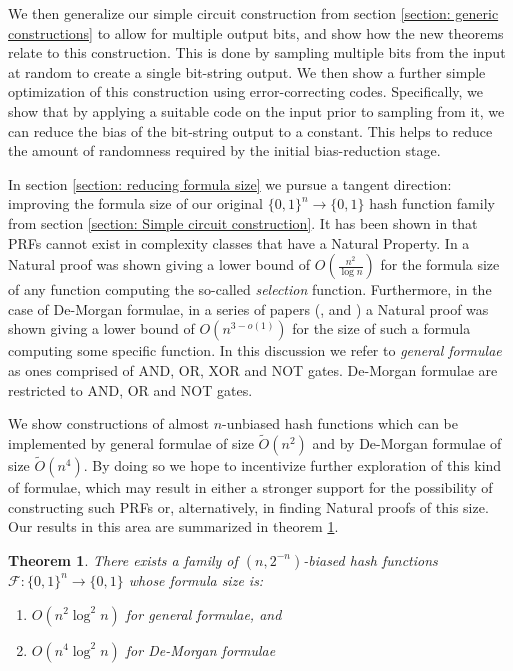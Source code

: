 \documentclass[12pt]{article}
\newtheorem{theorem}{Theorem}[section]
\newcommand{\zo}[1]{\{0,1\}^{#1}}
\begin{document}
	We then generalize our simple circuit construction from section \ref{section: generic constructions} to allow for multiple output bits, and show how the new theorems relate to this construction.
	This is done by sampling multiple bits from the input at random to create a single bit-string output.
	We then show a further simple optimization of this construction using error-correcting codes.
	Specifically, we show that by applying a suitable code on the input prior to sampling from it, we can reduce the bias of the bit-string output to a constant.
	This helps to reduce the amount of randomness required by the initial bias-reduction stage.
	
	In section \ref{section: reducing formula size} we pursue a tangent direction: improving the formula size of our original $\zo{n} \rightarrow \{0,1\}$ hash function family from section \ref{section: Simple circuit construction}.
	It has been shown in \cite{NaturalProofs} that PRFs cannot exist in complexity classes that have a Natural Property.
	In \cite{GeneralFormulaLowerBound} a Natural proof was shown giving a lower bound of $O(\frac{n^2}{\log n})$ for the formula size of any function computing the so-called \emph{selection} function.
	Furthermore, in the case of De-Morgan formulae, in a series of papers (\cite{Andreev87}, \cite{Impagliazzo93} and \cite{Hastad98}) a Natural proof was shown giving a lower bound of $O(n^{3 - o(1)})$ for the size of such a formula computing some specific function.
	In this discussion we refer to \emph{general formulae} as ones comprised of AND, OR, XOR and NOT gates.
	De-Morgan formulae are restricted to AND, OR and NOT gates.
	
	We show constructions of almost $n$-unbiased hash functions which can be implemented by general formulae of size $\tilde{O}(n^2)$ and by De-Morgan formulae of size $\tilde{O}(n^4)$.
	By doing so we hope to incentivize further exploration of this kind of formulae, which may result in either a stronger support for the possibility of constructing such PRFs or, alternatively, in finding Natural proofs of this size.
	Our results in this area are summarized in theorem \ref{theorem: Small-Sized Formulae}.
	
	\begin{theorem} \label{theorem: Small-Sized Formulae}
		There exists a family of $(n,2^{-n})$-biased hash functions $\mathcal{F}: \zo{n} \rightarrow \{0,1\}$ whose formula size is:
		\begin{enumerate}
			\item $O(n^2 \log^2 n)$ for general formulae, and
			\item $O(n^4 \log^2 n)$ for De-Morgan formulae
		\end{enumerate}
	\end{theorem}
	
\end{document}
